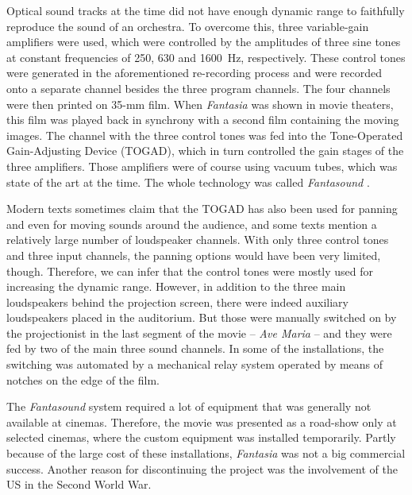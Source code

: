 Optical sound tracks at the time did not have enough dynamic range
to faithfully reproduce the sound of an orchestra.
To overcome this, three variable-gain amplifiers were used,
which were controlled by the amplitudes of three sine tones
at constant frequencies of \qty{250}{}, \qty{630}{} and \qty{1600}{\hertz},
respectively.
These control tones were generated in the aforementioned re-recording process
and were recorded onto a separate channel besides the three program channels.
The four channels were then printed on 35-mm film.
When \emph{Fantasia} was shown in movie theaters,
this film was played back in synchrony with a second film
containing the moving images.
The channel with the three control tones was fed into the
Tone-Operated Gain-Adjusting Device (TOGAD),
which in turn controlled the gain stages of the three amplifiers.
Those amplifiers were of course using vacuum tubes,
which was state of the art at the time.
The whole technology was called \emph{Fantasound}
\parencite{garity1941fantasound}.

Modern texts sometimes claim that
the TOGAD has also been used
for panning and even for moving sounds around the audience,
and some texts mention a relatively large number of loudspeaker channels.
With only three control tones and three input channels,
the panning options would have been very limited, though.
Therefore, we can infer that the control tones
were mostly used for increasing the dynamic range.
However,
in addition to the three main loudspeakers behind the projection screen,
there were indeed auxiliary loudspeakers placed in the auditorium.
But those were manually switched on by the projectionist
in the last segment of the movie -- \emph{Ave Maria} --
and they were fed by two of the main three sound channels.
In some of the installations,
the switching was automated by a mechanical relay system
operated by means of notches on the edge of the film.

The \emph{Fantasound} system
required a lot of equipment that was generally not available at cinemas.
Therefore, the movie was presented as a road-show only at selected cinemas,
where the custom equipment was installed temporarily.
Partly because of the large cost of these installations,
\emph{Fantasia} was not a big commercial success.
Another reason for discontinuing the project was the involvement of the US
in the Second World War.


